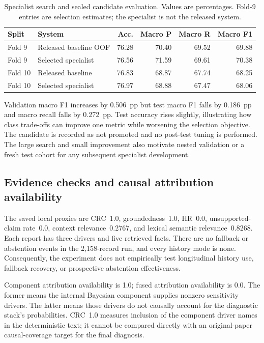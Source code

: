 \begin{table}[htbp]\centering\small
\begin{tabular}{llrrrr}\toprule
Split & System & Acc. & Macro P & Macro R & Macro F1\\\midrule
Fold 9 & Released baseline OOF & 76.28 & 70.40 & 69.52 & 69.88\\
Fold 9 & Selected specialist & 76.56 & 71.59 & 69.61 & 70.38\\
Fold 10 & Released baseline & 76.83 & 68.87 & 67.74 & 68.25\\
Fold 10 & Selected specialist & 76.97 & 68.88 & 67.47 & 68.06\\\bottomrule
\end{tabular}
\caption{Specialist search and sealed candidate evaluation. Values are percentages. Fold-9 entries are selection estimates; the specialist is not the released system.}\label{tab:specialist}\end{table}

Validation macro F1 increases by 0.506~pp but test macro F1 falls by 0.186~pp and macro recall falls by 0.272~pp. Test accuracy rises slightly, illustrating how class trade-offs can improve one metric while worsening the selection objective. The candidate is recorded as not promoted and no post-test tuning is performed. The large search and small improvement also motivate nested validation or a fresh test cohort for any subsequent specialist development.

\subsection{Evidence checks and causal attribution availability}
The saved local proxies are CRC~1.0, groundedness~1.0, HR~0.0, unsupported-claim rate~0.0, context relevance~0.2767, and lexical semantic relevance~0.8268. Each report has three drivers and five retrieved facts. There are no fallback or abstention events in the 2,158-record run, and every history mode is none. Consequently, the experiment does not empirically test longitudinal history use, fallback recovery, or prospective abstention effectiveness.

Component attribution availability is 1.0; fused attribution availability is 0.0. The former means the internal Bayesian component supplies nonzero sensitivity drivers. The latter means those drivers do not causally account for the diagnostic stack's probabilities. CRC~1.0 measures inclusion of the component driver names in the deterministic text; it cannot be compared directly with an original-paper causal-coverage target for the final diagnosis.

